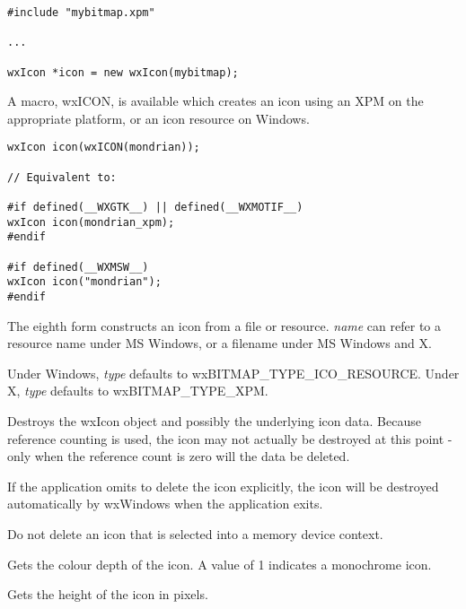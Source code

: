 \begin{verbatim}
#include "mybitmap.xpm"

...

wxIcon *icon = new wxIcon(mybitmap);
\end{verbatim}

A macro, wxICON, is available which creates an icon using an XPM
on the appropriate platform, or an icon resource on Windows.

\begin{verbatim}
wxIcon icon(wxICON(mondrian));

// Equivalent to:

#if defined(__WXGTK__) || defined(__WXMOTIF__)
wxIcon icon(mondrian_xpm);
#endif

#if defined(__WXMSW__)
wxIcon icon("mondrian");
#endif
\end{verbatim}

The eighth form constructs an icon from a file or resource. {\it name} can refer
to a resource name under MS Windows, or a filename under MS Windows and X.

Under Windows, {\it type} defaults to wxBITMAP\_TYPE\_ICO\_RESOURCE.
Under X, {\it type} defaults to wxBITMAP\_TYPE\_XPM.





Destroys the wxIcon object and possibly the underlying icon data.
Because reference counting is used, the icon may not actually be
destroyed at this point - only when the reference count is zero will the
data be deleted.

If the application omits to delete the icon explicitly, the icon will be
destroyed automatically by wxWindows when the application exits.

Do not delete an icon that is selected into a memory device context.



Gets the colour depth of the icon. A value of 1 indicates a
monochrome icon.

\label{wxicongetheight}


Gets the height of the icon in pixels.

